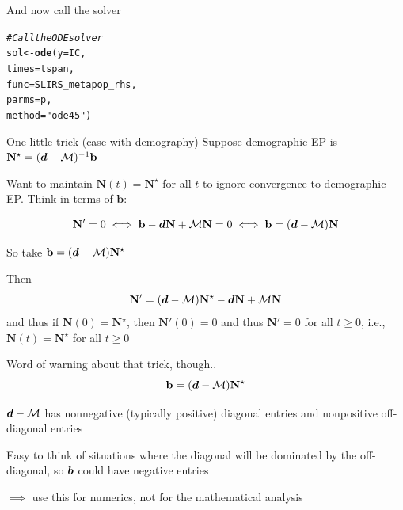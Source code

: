 \documentclass[aspectratio=169]{beamer}\usepackage[]{graphicx}\usepackage[]{xcolor}
\makeatletter
\newcommand{\hlsng}[1]{\textcolor[rgb]{0.192,0.494,0.8}{#1}}%
\newcommand{\hlcom}[1]{\textcolor[rgb]{0.678,0.584,0.686}{\textit{#1}}}%
\newcommand{\hldef}[1]{\textcolor[rgb]{0.345,0.345,0.345}{#1}}%
\newcommand{\hlkwb}[1]{\textcolor[rgb]{0.69,0.353,0.396}{#1}}%
\newcommand{\hlkwc}[1]{\textcolor[rgb]{0.333,0.667,0.333}{#1}}%
\newcommand{\hlkwd}[1]{\textcolor[rgb]{0.737,0.353,0.396}{\textbf{#1}}}%
\newenvironment{kframe}{%
 \def\at@end@of@kframe{}%
 \ifinner\ifhmode%
  \def\at@end@of@kframe{\end{minipage}}%
  \begin{minipage}{\columnwidth}%
 \fi\fi%
 \def\FrameCommand##1{\hskip\@totalleftmargin \hskip-\fboxsep
 \colorbox{shadecolor}{##1}\hskip-\fboxsep
     \hskip-\linewidth \hskip-\@totalleftmargin \hskip\columnwidth}%
 \MakeFramed {\advance\hsize-\width
   \@totalleftmargin\z@ \linewidth\hsize
   \@setminipage}}%
 {\par\unskip\endMakeFramed%
 \at@end@of@kframe}
\newenvironment{knitrout}{}{} %
\makeatother
\begin{document}
\begin{frame}[fragile]{And now call the solver}
\begin{knitrout}
\color{fgcolor}\begin{kframe}
\begin{alltt}
\hlcom{# Call the ODE solver}
\hldef{sol} \hlkwb{<-} \hlkwd{ode}\hldef{(}\hlkwc{y} \hldef{= IC,}
                        \hlkwc{times} \hldef{= tspan,}
                        \hlkwc{func} \hldef{= SLIRS_metapop_rhs,}
                        \hlkwc{parms} \hldef{= p,}
                        \hlkwc{method} \hldef{=} \hlsng{"ode45"}\hldef{)}
\end{alltt}


{\ttfamily\noindent\bfseries\color{errorcolor}{\#\# Error: object 'SLIRS\_metapop\_rhs' not found}}\end{kframe}
\end{knitrout}
\end{frame}
	
\begin{frame}[fragile]{One little trick (case with demography)}
	Suppose demographic EP is $\mathbf{N}^\star=(\bm{d}-\mathcal{M})^{-1}\mathbf{b}$

	Want to maintain $\mathbf{N}(t)=\mathbf{N}^\star$ for all $t$ to ignore convergence to demographic EP. Think in terms of $\mathbf{b}$:
	
	$$
	\mathbf{N}'=0\iff \mathbf{b}-\bm{d}\mathbf{N}+\mathcal{M}\mathbf{N}=0 \iff \mathbf{b} = (\bm{d}-\mathcal{M})\mathbf{N}
	$$
	
	So take $\mathbf{b}=(\bm{d}-\mathcal{M})\mathbf{N}^\star$
	
	Then
	$$
	\mathbf{N}' = (\bm{d}-\mathcal{M})\mathbf{N}^\star
	-\bm{d}\mathbf{N}+\mathcal{M}\mathbf{N}
	$$
	and thus if $\mathbf{N}(0)=\mathbf{N}^\star$, then $\mathbf{N}'(0)=0$ and thus $\mathbf{N}'=0$ for all $t\geq 0$, i.e., $\mathbf{N}(t)=\mathbf{N}^\star$ for all $t\geq 0$
\end{frame}

\begin{frame}{Word of warning about that trick, though..}
$$
\mathbf{b}=(\bm{d}-\mathcal{M})\mathbf{N}^\star
$$
	
$\bm{d}-\mathcal{M}$ has nonnegative (typically positive) diagonal entries and nonpositive off-diagonal entries
	
Easy to think of situations where the diagonal will be dominated by the off-diagonal, so $\bm{b}$ could have negative entries
	
$\implies$ use this for numerics, not for the mathematical analysis
\end{frame}
\end{document}
